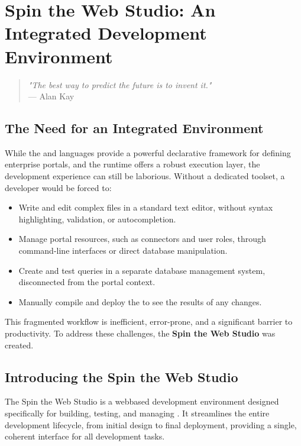 \chapter{Spin the Web Studio: An Integrated Development Environment}
\label{chap:studio}

\begin{quote}
\textit{"The best way to predict the future is to invent it."} \\
— Alan Kay
\end{quote}

\section{The Need for an Integrated Environment}
\label{sec:studio-need}

While the \wbol{} and \wbpl{} languages provide a powerful declarative framework for defining enterprise portals, and the \webspinner{} runtime offers a robust execution layer, the development experience can still be laborious. Without a dedicated toolset, a developer would be forced to:

\begin{itemize}
    \item Write and edit complex \wbol{} files in a standard text editor, without syntax highlighting, validation, or autocompletion.
    \item Manage portal resources, such as connectors and user roles, through command-line interfaces or direct database manipulation.
    \item Create and test \wbpl{} queries in a separate database management system, disconnected from the portal context.
    \item Manually compile and deploy the \webbase{} to see the results of any changes.
\end{itemize}

This fragmented workflow is inefficient, error-prone, and a significant barrier to productivity. To address these challenges, the \textbf{Spin the Web Studio} was created.

\section{Introducing the Spin the Web Studio}
\label{sec:studio-intro}

The Spin the Web Studio is a webbased development environment designed specifically for building, testing, and managing . It streamlines the entire development lifecycle, from initial design to final deployment, providing a single, coherent interface for all development tasks.

